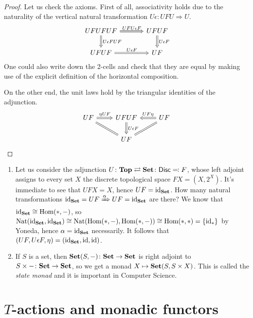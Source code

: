 \documentclass[a4paper,11pt,oneside,openany]{scrbook}
\begin{document}
\begin{proof}
	Let us check the axioms. First of all, associativity holds due to the naturality of the vertical natural transformation $U\epsilon\colon UFU\Rightarrow U$.
	\[
		\begin{tikzcd}[column sep=3.5em]
			UFUFUF\ar[r, Rightarrow, "UFU\epsilon F"]\ar[d, Rightarrow, "U\epsilon FUF"]
			& UFUF\ar[d, Rightarrow, "U\epsilon F"] \\
			UFUF\ar[r, Rightarrow, "U\epsilon F"]
			& UF
		\end{tikzcd}
	\]
	One could also write down the 2-cells and check that they are equal by making use of the explicit definition of the horizontal composition.

	On the other end, the unit laws hold by the triangular identities of the adjunction.
	\[
		\begin{tikzcd}
			UF\ar[r, Rightarrow, "\eta UF"]\ar[dr, equal]
			& UFUF\ar[d, Rightarrow, "U\epsilon F"]
			& UF\ar[l, Rightarrow, swap, "UF\eta"]\ar[dl, Rightarrow, equal] \\
			& UF
		\end{tikzcd}
	\]
\end{proof}

\begin{exmp}
	\begin{enumerate}
		\item Let us consider the adjunction $U\colon\mathbf{Top}\rightleftarrows{\normalfont\textbf{Set}}\colon\mathsf{Disc}\eqqcolon F$, whose left adjoint assigns to every set $X$ the discrete topological space $FX=(X, 2^X)$.
		      It's immediate to see that $UFX=X$, hence $UF=\operatorname{id}_{\normalfont\textbf{Set}}$. How many natural transformations $\operatorname{id}_{\normalfont\textbf{Set}}=UF\xRightarrow{\alpha} UF=\operatorname{id}_{\normalfont\textbf{Set}}$ are there?
		      We know that $\operatorname{id}_{\normalfont\textbf{Set}}\cong\operatorname{\text{Hom}}(*,-)$, so $\text{Nat}(\operatorname{id}_{\normalfont\textbf{Set}},
			      \operatorname{id}_{\normalfont\textbf{Set}})\cong\text{Nat}(\operatorname{\text{Hom}}(*,-),\operatorname{\text{Hom}}(*,-))\cong\operatorname{\text{Hom}}(*,*)=\{\operatorname{id}_*\}$
                  by Yoneda, hence $\alpha=\operatorname{id}_{\normalfont\textbf{Set}}$ necessarily. It follows
                  that $(UF,U\epsilon F,\eta)=(\operatorname{id}_{\normalfont\textbf{Set}}, \operatorname{id}, \operatorname{id})$.
		\item If $S$ is a set, then ${\normalfont\textbf{Set}}(S,-)\colon{\normalfont\textbf{Set}}\to{\normalfont\textbf{Set}}$ is right
            adjoint to $S\times-\colon{\normalfont\textbf{Set}}\to{\normalfont\textbf{Set}}$, so we get a monad
            $X\mapsto{\normalfont\textbf{Set}}(S,S\times X)$. This is called the \emph{state monad}
            and it is important in Computer Science.
	\end{enumerate}
\end{exmp}


\section{$T$-actions and monadic functors}
\end{document}
